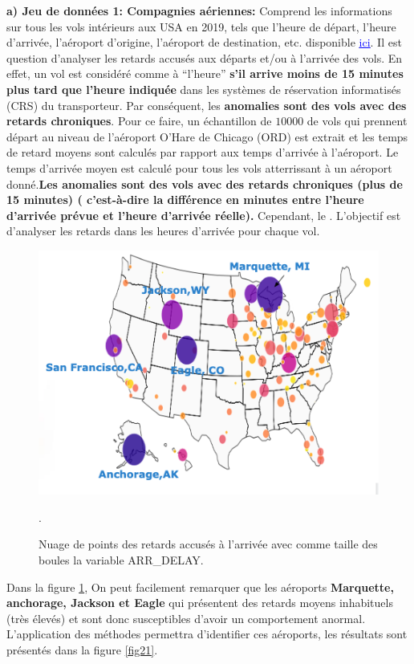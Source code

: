 %
%
\noindent \textbf{a) Jeu de données 1: Compagnies aériennes:} Comprend les informations sur tous les vols intérieurs aux USA  en 2019, tels que l'heure de départ, l'heure d'arrivée, l'aéroport d'origine, l'aéroport de destination, etc. disponible  \href{https://www.transtats.bts.gov/DL_SelectFields.asp?Table_ID=}{\textcolor{blue}{\underline{ici}}}. Il est question d’analyser les retards accusés aux  départs et/ou à l’arrivée des vols. En effet, un vol est considéré comme à “l’heure”  \textbf{s’il arrive moins de 15 minutes plus tard que l'heure indiquée} dans les systèmes de réservation informatisés (CRS) du transporteur. Par conséquent, les \textbf{anomalies sont des vols avec des retards chroniques}. Pour ce faire, un échantillon de $10000$ de vols qui prennent départ au niveau de l'aéroport O'Hare de Chicago (ORD) est extrait et les temps de retard moyens sont calculés par rapport aux temps d'arrivée à l'aéroport. Le temps d'arrivée moyen est calculé pour tous les vols atterrissant à un aéroport donné.\textbf{Les anomalies sont des vols avec des retards chroniques (plus de 15 minutes) ( c'est-à-dire la différence en minutes entre l'heure d'arrivée prévue et l'heure d'arrivée réelle).} Cependant, le .  L'objectif est d'analyser les retards dans les heures d'arrivée pour chaque vol.
\begin{figure}[H]
    \centering
    \includegraphics[width=.50\textwidth]{ADOA/Images/Vol_scatterplot.png}
    \caption{Nuage de points des retards accusés à l'arrivée avec comme taille des boules la variable ARR\_DELAY.}%
    \label{fig20}.
\end{figure}
\noindent Dans la figure \ref{fig20}, On peut facilement remarquer que les aéroports \textbf{Marquette, anchorage, Jackson et Eagle} qui présentent des retards moyens inhabituels (très élevés) et sont donc susceptibles d'avoir un comportement anormal. L'application des méthodes permettra d'identifier ces aéroports, les résultats sont présentés dans la figure \ref{fig21}.\newl
